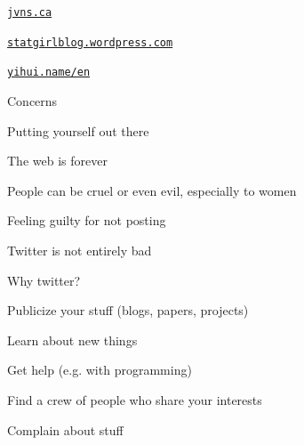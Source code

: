 \documentclass[12pt,t,aspectratio=169]{beamer}
\begin{document}
\begin{frame}[c]{}


\vfill \hfill \href{https://jvns.ca}{\tt \small \lolit jvns.ca}

\end{frame}




\begin{frame}[c]{}


\vfill \hfill \href{https://statgirlblog.wordpress.com}{\tt \small \lolit statgirlblog.wordpress.com}

\end{frame}




\begin{frame}[c]{}


\vfill \hfill \href{https://yihui.name/en}{\tt \small \lolit yihui.name/en}

\end{frame}


\begin{frame}[c]{Concerns}

  \bbi
\item Putting yourself out there
\item The web is forever
\item People can be cruel or even evil, {\hilit especially to women}
\item Feeling guilty for not posting
  \ei

\end{frame}





{

\begin{frame}[c]{}

\centerline{
\color{background}
  \Large Twitter is not entirely bad
}


\end{frame}
}


\begin{frame}[c]{Why twitter?}

  \bbi
\item Publicize your stuff (blogs, papers, projects)
\item Learn about new things
\item Get help (e.g. with programming)
\item Find a crew of people who share your interests
\item Complain about stuff
  \ei

\end{frame}
\end{document}
